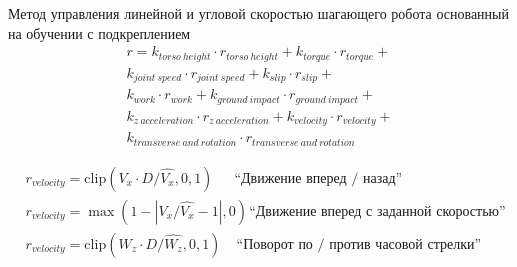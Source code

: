 \begin{frame}{Метод управления линейной и угловой скоростью шагающего робота основанный на обучении с подкреплением}
\begin{multline*}
    r = k_{torso\ height} \cdot r_{torso\ height} +
    k_{torque} \cdot r_{torque} +\\
    k_{joint\ speed} \cdot r_{joint\ speed} +
    k_{slip} \cdot r_{slip} +\\
    k_{work} \cdot r_{work} + 
    k_{ground\ impact} \cdot r_{ground\ impact} +\\
    k_{z\ acceleration} \cdot r_{z\ acceleration} +  k_{velocity} \cdot r_{velocity} +\\
    k_{transverse\ and\ rotation} \cdot r_{transverse\ and\ rotation}
\label{eq:unitree_reward}
\end{multline*}

\begin{align*}
& r_{velocity} = \mathrm{clip}(V_x \cdot D / \hat{V_x}, 0, 1) \hspace{18pt}\text{``Движение вперед / назад''}\\
& r_{velocity} = \max(1 - |V_x / \hat{V_x} - 1|, 0) \hspace{1pt}\text{``Движение вперед с заданной скоростью''}\\
& r_{velocity} = \mathrm{clip}(W_z \cdot D / \hat{W_z}, 0, 1) \hspace{13pt}\text{``Поворот по / против часовой стрелки''}
\end{align*}
\end{frame}

